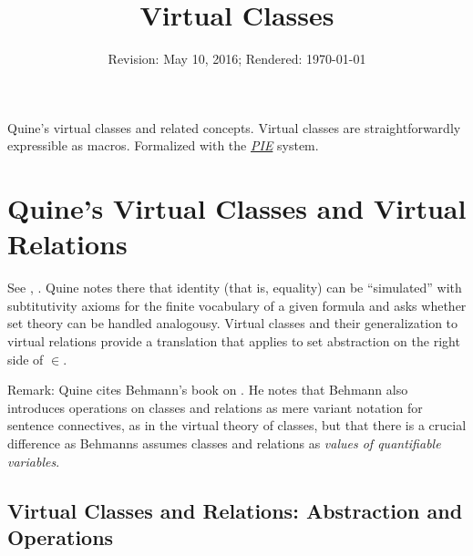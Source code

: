 \documentclass[a4paper]{article}
\begin{document}
%
%
\title{Virtual Classes}
\date{Revision: May 10, 2016; Rendered: \today}  
\maketitle

\noindent Quine's virtual classes and related concepts.  Virtual classes are
straightforwardly expressible as macros.  Formalized with the
\href{http://cs.christophwernhard.com/pie/}{\textit{PIE}} system.
%
%
\section{Quine's Virtual Classes and Virtual Relations}

See
\cite[Chap.~5 The Scope of Logic]{quine:1970:philosophy-of-logic},
\cite[Chap.~I]{quine:1969:set-theory-and-its-logic-revised}.
Quine notes there that identity (that is, equality) can be ``simulated''
with subtitutivity axioms for the finite vocabulary of a given formula and
asks whether set theory can be handled analogousy.
Virtual classes and their generalization to virtual relations provide a
translation that applies to set abstraction on the right side of $\in$.

Remark: Quine cites Behmann's book \cite{beh:27} on
\cite[p.~19]{quine:1969:set-theory-and-its-logic-revised}. He notes that
Behmann also introduces operations on classes and relations as mere variant
notation for sentence connectives, as in the virtual theory of classes, but
that there is a crucial difference as Behmanns assumes classes and relations
as \emph{values of quantifiable variables}.
%
%
\subsection{Virtual Classes and Relations: Abstraction and Operations}
\end{document}
